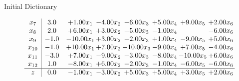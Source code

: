 \documentclass[8pt]{article}
\begin{document}
Initial Dictionary 

\[\begin{array}{c| c c@{\hskip 2pt} c@{\hskip 2pt} c@{\hskip 2pt} c@{\hskip 2pt} c@{\hskip 2pt} c@{\hskip 2pt} }
 x_{7}   &  3.0 & +  1.00 x_{1} & -4.00 x_{2} & -6.00 x_{3} & +  5.00 x_{4} & +  9.00 x_{5} & +  2.00 x_{6}\\
 x_{8}   &  2.0 & +  6.00 x_{1} & +  3.00 x_{2} & -5.00 x_{3} & -1.00 x_{4} &   & -6.00 x_{6}\\
 x_{9}   &  -1.0 & -10.00 x_{1} & +  3.00 x_{2} & -2.00 x_{3} & +  1.00 x_{4} & -9.00 x_{5} & +  5.00 x_{6}\\
 x_{10}   &  -1.0 & + 10.00 x_{1} & +  7.00 x_{2} & -10.00 x_{3} & -9.00 x_{4} & +  7.00 x_{5} & -4.00 x_{6}\\
 x_{11}   &  -3.0 & +  7.00 x_{1} & -9.00 x_{2} & -3.00 x_{3} & -8.00 x_{4} & -10.00 x_{5} & +  6.00 x_{6}\\
 x_{12}   &  1.0 & -8.00 x_{1} & +  6.00 x_{2} & -2.00 x_{3} & -1.00 x_{4} & -6.00 x_{5} & -6.00 x_{6}\\
\hline
z    &  0.0 & -1.00 x_{1} & -3.00 x_{2} & +  5.00 x_{3} & +  5.00 x_{4} & +  3.00 x_{5} & +  2.00 x_{6}\\
\end{array}\]
\end{document}
